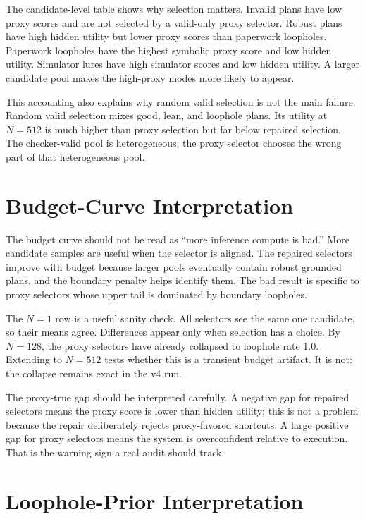 \documentclass{article}
\begin{document}
The candidate-level table shows why selection matters. Invalid plans have low
proxy scores and are not selected by a valid-only proxy selector. Robust plans
have high hidden utility but lower proxy scores than paperwork loopholes.
Paperwork loopholes have the highest symbolic proxy score and low hidden
utility. Simulator lures have high simulator scores and low hidden utility. A
larger candidate pool makes the high-proxy modes more likely to appear.

This accounting also explains why random valid selection is not the main
failure. Random valid selection mixes good, lean, and loophole plans. Its
utility at $N=512$ is much higher than proxy selection but far below repaired
selection. The checker-valid pool is heterogeneous; the proxy selector chooses
the wrong part of that heterogeneous pool.

\section{Budget-Curve Interpretation}

The budget curve should not be read as ``more inference compute is bad.'' More
candidate samples are useful when the selector is aligned. The repaired
selectors improve with budget because larger pools eventually contain robust
grounded plans, and the boundary penalty helps identify them. The bad result is
specific to proxy selectors whose upper tail is dominated by boundary
loopholes.

The $N=1$ row is a useful sanity check. All selectors see the same one
candidate, so their means agree. Differences appear only when selection has a
choice. By $N=128$, the proxy selectors have already collapsed to loophole rate
1.0. Extending to $N=512$ tests whether this is a transient budget artifact. It
is not: the collapse remains exact in the v4 run.

The proxy-true gap should be interpreted carefully. A negative gap for repaired
selectors means the proxy score is lower than hidden utility; this is not a
problem because the repair deliberately rejects proxy-favored shortcuts. A
large positive gap for proxy selectors means the system is overconfident
relative to execution. That is the warning sign a real audit should track.

\section{Loophole-Prior Interpretation}
\end{document}
